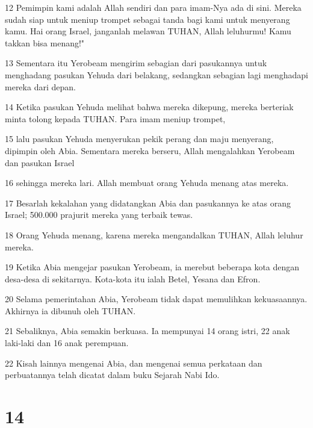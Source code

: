 \par 12 Pemimpin kami adalah Allah sendiri dan para imam-Nya ada di sini. Mereka sudah siap untuk meniup trompet sebagai tanda bagi kami untuk menyerang kamu. Hai orang Israel, janganlah melawan TUHAN, Allah leluhurmu! Kamu takkan bisa menang!"
\par 13 Sementara itu Yerobeam mengirim sebagian dari pasukannya untuk menghadang pasukan Yehuda dari belakang, sedangkan sebagian lagi menghadapi mereka dari depan.
\par 14 Ketika pasukan Yehuda melihat bahwa mereka dikepung, mereka berteriak minta tolong kepada TUHAN. Para imam meniup trompet,
\par 15 lalu pasukan Yehuda menyerukan pekik perang dan maju menyerang, dipimpin oleh Abia. Sementara mereka berseru, Allah mengalahkan Yerobeam dan pasukan Israel
\par 16 sehingga mereka lari. Allah membuat orang Yehuda menang atas mereka.
\par 17 Besarlah kekalahan yang didatangkan Abia dan pasukannya ke atas orang Israel; 500.000 prajurit mereka yang terbaik tewas.
\par 18 Orang Yehuda menang, karena mereka mengandalkan TUHAN, Allah leluhur mereka.
\par 19 Ketika Abia mengejar pasukan Yerobeam, ia merebut beberapa kota dengan desa-desa di sekitarnya. Kota-kota itu ialah Betel, Yesana dan Efron.
\par 20 Selama pemerintahan Abia, Yerobeam tidak dapat memulihkan kekuasaannya. Akhirnya ia dibunuh oleh TUHAN.
\par 21 Sebaliknya, Abia semakin berkuasa. Ia mempunyai 14 orang istri, 22 anak laki-laki dan 16 anak perempuan.
\par 22 Kisah lainnya mengenai Abia, dan mengenai semua perkataan dan perbuatannya telah dicatat dalam buku Sejarah Nabi Ido.

\chapter{14}

